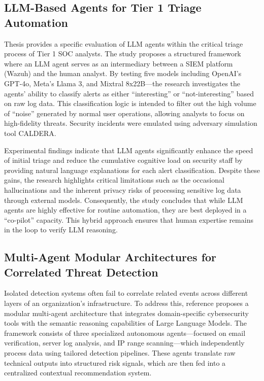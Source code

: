 \documentclass[conference]{IEEEtran}
\begin{document}
\subsection{LLM-Based Agents for Tier 1 Triage Automation}
Thesis \cite{b9} provides a specific evaluation of LLM agents within the critical triage process of Tier 1 SOC analysts. 
The study proposes a structured framework where an LLM agent serves as an intermediary between a SIEM platform (Wazuh) and the human analyst. 
By testing five models including OpenAI’s GPT-4o, Meta’s Llama 3, and Mixtral 8x22B—the research investigates the agents' ability to classify alerts as either 
``interesting'' or ``not-interesting'' based on raw log data. This classification logic is intended to filter out the high volume of ``noise'' generated by normal user operations,
allowing analysts to focus on high-fidelity threats. Security incidents were emulated using adversary simulation tool CALDERA.

Experimental findings indicate that LLM agents significantly enhance the speed of initial triage and reduce the cumulative cognitive load on security staff 
by providing natural language explanations for each alert classification. Despite these gains, the research highlights critical limitations such as the 
occasional hallucinations and the inherent privacy risks of processing sensitive log data through external models. 
Consequently, the study concludes that while LLM agents are highly effective for routine automation, they are best deployed in a ``co-pilot'' capacity. 
This hybrid approach ensures that human expertise remains in the loop to verify LLM reasoning.


\subsection{Multi-Agent Modular Architectures for Correlated Threat Detection}\label{sec:siem_end}
Isolated detection systems often fail to correlate related events across different layers of an organization’s infrastructure. 
To address this, reference \cite{b12} proposes a modular multi-agent architecture that integrates domain-specific cybersecurity tools with the semantic reasoning 
capabilities of Large Language Models. 
The framework consists of three specialized autonomous agents—focused on email verification, server log analysis, 
and IP range scanning—which independently process data using tailored detection pipelines. 
These agents translate raw technical outputs into structured risk signals, which are then fed into a centralized contextual recommendation system.
\end{document}
